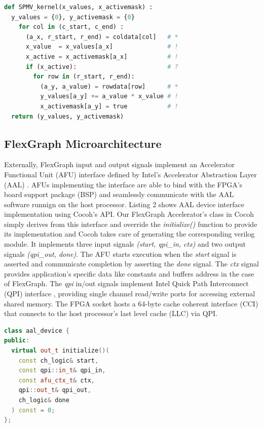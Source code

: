 \begin{lstlisting}[language=Python, caption=Pseudo-code for SPMV kernel]
def SPMV_kernel(x_values, x_activemask) :
  y_values = {0}, y_activemask = {0}
    for col in (c_start, c_end) :            	
      (a_x, r_start, r_end) = coldata[col]   # *
      x_value  = x_values[a_x]               # !
      x_active = x_activemask[a_x]           # !
      if (x_active):                         # ?
        for row in (r_start, r_end):         
          (a_y, a_value) = rowdata[row]      # *
          y_values[a_y] += a_value * x_value # !
          x_activemask[a_y] = true           # !
  return (y_values, y_activemask)
\end{lstlisting}

\subsection{FlexGraph Microarchitecture}

Externally, FlexGraph input and output signals implement an Accelerator Functional Unit (AFU) interface defined by Intel's Accelerator Abstraction Layer (AAL) \cite{Intel-FPGA}. AFUs implementing the interface are able to bind with the FPGA's board support package (BSP) and seamlessly communicate with the AAL software runnign on the host processor. Listing 2 shows AAL device interface implementation using Cocoh's API. Our FlexGraph Accelerator's class in Cocoh simply derives from this interface and override the \textit{initialize()} function to provide its implementation and Cocoh takes care of generating the corresponding verilog module. It implements three input signals \textit{(start, qpi\_in, ctx)} and two output signals \textit{(qpi\_out, done)}. The AFU starts execution when the \textit{start} signal is asserted and communicate completion by asserting the \textit{done} signal. The \textit{ctx} signal provides application's specific data like constants and buffers address in the case of FlexGraph. The \textit{qpi} in/out signals implement Intel Quick Path Interconnect (QPI) interface \cite{QPI}, providing single channel read/write ports for accessing external shared memory. The FPGA socket hosts a 64-byte cache coherent interface (CCI) \cite{CCI} that connects to the host processor's last level cache (LLC) via QPI.     

\begin{lstlisting}[language=C++, caption=AAL Device Interface in Cocoh C++]
class aal_device {
public: 
  virtual out_t initialize()(
    const ch_logic& start, 
    const qpi::in_t& qpi_in, 
    const afu_ctx_t& ctx, 
    qpi::out_t& qpi_out, 
    ch_logic& done
  ) const = 0;  
};
\end{lstlisting}

